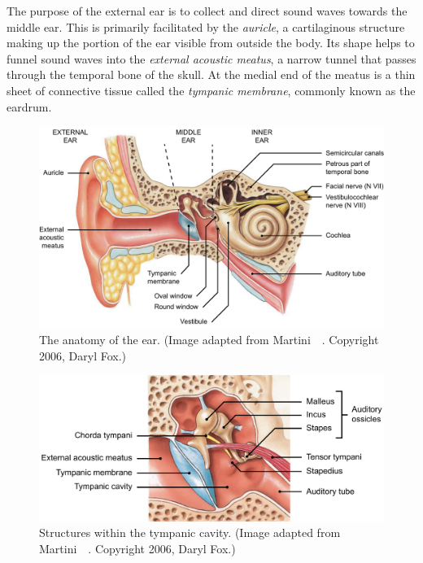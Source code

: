 The purpose of the external ear is to collect and direct sound waves towards the
middle ear. This is primarily facilitated by the \emph{auricle}, a cartilaginous
structure making up the portion of the ear visible from outside the body. Its
shape helps to funnel sound waves into the \emph{external acoustic meatus}, a
narrow tunnel that passes through the temporal bone of the skull. At the medial
end of the meatus is a thin sheet of connective tissue called the \emph{tympanic
membrane}, commonly known as the eardrum.

\begin{figure}[p]
	\centering
	\includegraphics[width=\textwidth]{Background/ear_labelled.pdf}
	\caption[The anatomy of the ear]{The anatomy of the ear. (Image adapted from
	Martini~\etal~\cite{martini2006}. Copyright \textcopyright{} 2006, Daryl Fox.)}
	\label{fig:ear_overview}
\end{figure}

\begin{figure}[p]
	\centering
	\includegraphics[width=13.3cm]{Background/middle_ear_labelled.pdf}
	\caption[Structures within the tympanic cavity]{Structures within the
	tympanic cavity. (Image adapted from Martini~\etal~\cite{martini2006}.
	Copyright \textcopyright{} 2006, Daryl Fox.)}
	\label{fig:middle_ear}
\end{figure}

